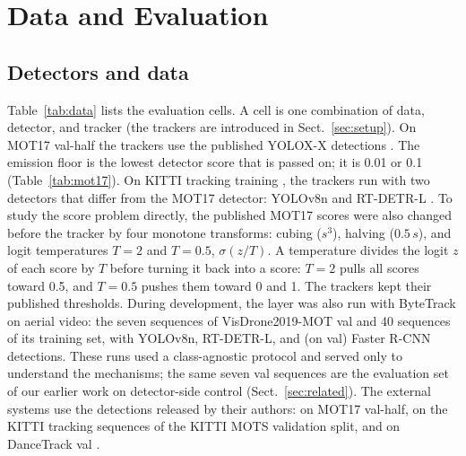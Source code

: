 \documentclass[pdflatex,sn-mathphys-num]{sn-jnl}
\begin{document}
\section{Data and Evaluation}\label{sec:data-eval}

\subsection{Detectors and data}\label{sec:data}
Table~\ref{tab:data} lists the evaluation cells. A cell is one combination of
data, detector, and tracker (the trackers are introduced in
Sect.~\ref{sec:setup}). On MOT17 val-half \cite{milan2016mot16} the trackers
use the published YOLOX-X detections \cite{ge2021yolox}. The emission floor is
the lowest detector score that is passed on; it is 0.01 or 0.1
(Table~\ref{tab:mot17}). On KITTI tracking training \cite{geiger2012kitti},
the trackers run with two detectors that differ from the MOT17 detector:
YOLOv8n \cite{jocher2023yolov8} and RT-DETR-L \cite{zhao2024rtdetr}. To study
the score problem directly, the published MOT17 scores were also changed
before the tracker by four monotone transforms: cubing ($s^3$), halving ($0.5\,s$),
and logit temperatures $T=2$ and $T=0.5$, $\sigma(z/T)$. A temperature
divides the logit $z$ of each score by $T$ before turning it back into a
score: $T=2$ pulls all scores toward 0.5, and $T=0.5$ pushes them toward 0
and 1. The trackers kept their published thresholds. During development,
the layer was also run with ByteTrack on aerial video: the seven sequences of
VisDrone2019-MOT val \cite{zhu2022visdrone} and 40 sequences of its training
set, with YOLOv8n, RT-DETR-L, and (on val) Faster R-CNN detections. These runs
used a class-agnostic protocol and served only to understand the mechanisms;
the same seven val sequences are the evaluation set of our earlier work on
detector-side control (Sect.~\ref{sec:related}). The external systems use the
detections released by their authors: on MOT17 val-half, on the KITTI
tracking sequences of the KITTI MOTS validation split, and on DanceTrack val
\cite{sun2022dancetrack}.
\end{document}
